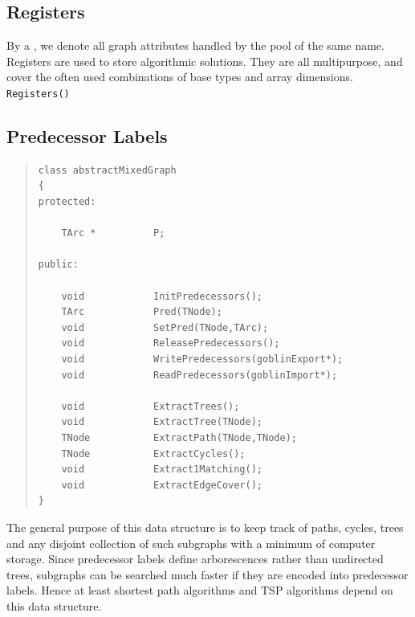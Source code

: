\documentclass[a4paper,11pt,twoside]{book}
\begin{document}
\begin{multicols}{2}
\section{Registers}
\label{slb_registers}
By a , we denote all graph attributes handled by the pool of the same
name. Registers are used to store algorithmic solutions. They are all multipurpose,
and cover the often used combinations of base types and array dimensions.
\verb/Registers()/

\subsection{Predecessor Labels}
\label{slb_pred}
\methods
\begin{quote}
\begin{verbatim}
class abstractMixedGraph
{
protected:

    TArc *          P;

public:

    void            InitPredecessors();
    TArc            Pred(TNode);
    void            SetPred(TNode,TArc);
    void            ReleasePredecessors();
    void            WritePredecessors(goblinExport*);
    void            ReadPredecessors(goblinImport*);

    void            ExtractTrees();
    void            ExtractTree(TNode);
    TNode           ExtractPath(TNode,TNode);
    TNode           ExtractCycles();
    void            Extract1Matching();
    void            ExtractEdgeCover();
}
\end{verbatim}
\end{quote}
The general purpose of this data structure is to keep track of paths, cycles,
trees and any disjoint collection of such subgraphs with a minimum of computer
storage. Since predecessor labels define arborescences rather than
undirected trees, subgraphs can be searched much faster if they are encoded
into predecessor labels. Hence at least shortest path algorithms and TSP
algorithms depend on this data structure.


\end{multicols}
\end{document}
